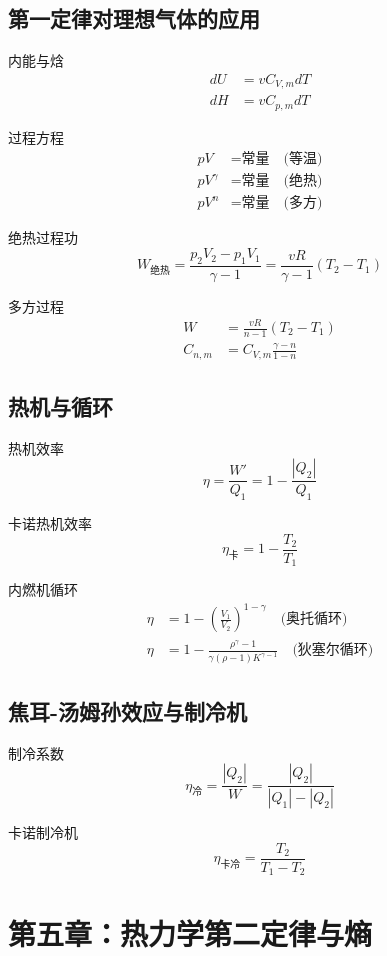 \documentclass[12pt]{article}
\begin{document}
\subsection{第一定律对理想气体的应用}
内能与焓
\begin{align*}
    dU &= vC_{V,m}dT \\
    dH &= vC_{p,m}dT
\end{align*}

过程方程
\begin{align*}
    pV &= \text{常量} \quad \text{(等温)} \\
    pV^\gamma &= \text{常量} \quad \text{(绝热)} \\
    pV^n &= \text{常量} \quad \text{(多方)}
\end{align*}

绝热过程功
\[
W_{\text{绝热}} = \frac{p_2V_2 - p_1V_1}{\gamma - 1} = \frac{vR}{\gamma - 1}(T_2 - T_1)
\]

多方过程
\begin{align*}
    W &= \frac{vR}{n-1}(T_2 - T_1) \\
    C_{n,m} &= C_{V,m} \frac{\gamma - n}{1 - n}
\end{align*}

\subsection{热机与循环}
热机效率
\[
\eta = \frac{W'}{Q_1} = 1 - \frac{|Q_2|}{Q_1}
\]

卡诺热机效率
\[
\eta_{\text{卡}} = 1 - \frac{T_2}{T_1}
\]

内燃机循环
\begin{align*}
    \eta &= 1 - \left(\frac{V_1}{V_2}\right)^{1-\gamma} \quad \text{(奥托循环)} \\
    \eta &= 1 - \frac{\rho^\gamma - 1}{\gamma(\rho - 1)K^{\gamma-1}} \quad \text{(狄塞尔循环)}
\end{align*}

\subsection{焦耳-汤姆孙效应与制冷机}
制冷系数
\[
\eta_{\text{冷}} = \frac{|Q_2|}{W} = \frac{|Q_2|}{|Q_1| - |Q_2|}
\]

卡诺制冷机
\[
\eta_{\text{卡冷}} = \frac{T_2}{T_1 - T_2}
\]

\section{第五章：热力学第二定律与熵}
\end{document}
